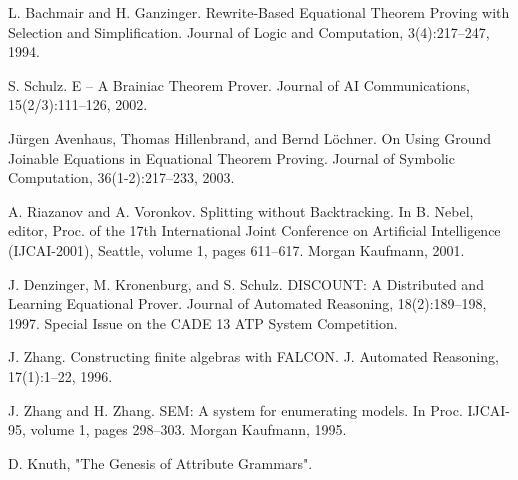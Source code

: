 \begin{thebibliography}{tesis}
	L. Bachmair and H. Ganzinger. Rewrite-Based Equational Theorem Proving with Selection and Simplification. Journal of Logic and Computation, 3(4):217–247, 1994.

S. Schulz. E – A Brainiac Theorem Prover. Journal of AI Communications, 15(2/3):111–126, 2002.

Jürgen Avenhaus, Thomas Hillenbrand, and Bernd Löchner. On Using Ground Joinable Equations in Equational Theorem Proving. Journal of Symbolic Computation, 36(1-2):217–233, 2003.

A. Riazanov and A. Voronkov. Splitting without Backtracking. In B. Nebel, editor, Proc. of the 17th International Joint Conference on Artificial Intelligence (IJCAI-2001), Seattle, volume 1, pages 611–617. Morgan Kaufmann, 2001.

J. Denzinger, M. Kronenburg, and S. Schulz. DISCOUNT: A Distributed and Learning Equational Prover. Journal of Automated Reasoning, 18(2):189–198, 1997. Special Issue on the CADE 13 ATP System Competition.

 J. Zhang. Constructing finite algebras with FALCON. J. Automated Reasoning, 17(1):1–22,
1996.

 J. Zhang and H. Zhang. SEM: A system for enumerating models. In Proc. IJCAI-95,
volume 1, pages 298–303. Morgan Kaufmann, 1995.

 D. Knuth, "The Genesis of Attribute Grammars".

\end{thebibliography}

